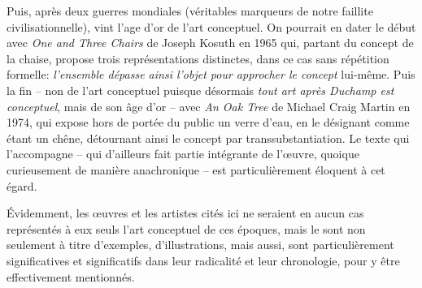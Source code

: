 \documentclass{article}
\begin{document}
Puis, après deux guerres mondiales (véritables marqueurs de notre faillite civilisationnelle), vint l'age d'or de l'art conceptuel. On pourrait en dater le début avec \textit{One and Three Chairs} de Joseph Kosuth en 1965 qui, partant du concept de la chaise, propose trois représentations distinctes, dans ce cas sans répétition formelle: \textit{l'ensemble dépasse ainsi l’objet pour approcher le concept} lui-même. 
Puis la fin -- non de l'art conceptuel puisque désormais \textit{tout art après Duchamp est conceptuel}, %
mais de son âge d'or -- avec \textit{An Oak Tree} de Michael Craig Martin en 1974, qui expose hors de portée du public un verre d'eau, en le désignant comme étant un chêne, détournant ainsi le concept par transsubstantiation. Le texte qui l'accompagne -- qui d'ailleurs fait partie intégrante de l'œuvre, quoique curieusement de manière anachronique -- est particulièrement éloquent à cet égard.  

Évidemment, les œuvres et les artistes cités ici ne seraient en aucun cas représentés à eux seuls l'art conceptuel de ces époques, mais le sont non seulement à titre d'exemples, d'illustrations, mais aussi, sont particulièrement significatives et significatifs dans leur radicalité et leur chronologie, pour y être effectivement mentionnés.

\bigskip
\end{document}
